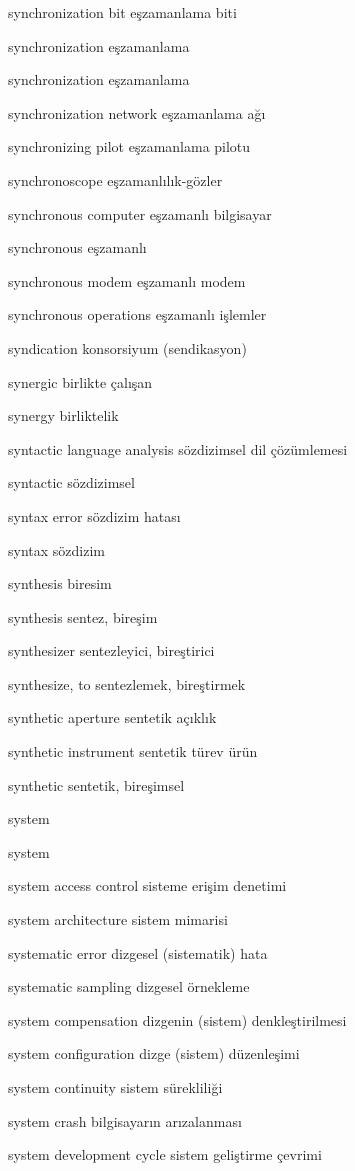 \documentclass[12pt,fleqn]{article}\usepackage{../../common}
\begin{document}
synchronization bit eşzamanlama biti

synchronization eşzamanlama

synchronization eşzamanlama

synchronization network eşzamanlama ağı

synchronizing pilot eşzamanlama pilotu

synchronoscope eşzamanlılık-gözler

synchronous computer eşzamanlı bilgisayar

synchronous eşzamanlı

synchronous modem eşzamanlı modem

synchronous operations eşzamanlı işlemler

syndication konsorsiyum (sendikasyon)

synergic birlikte çalışan

synergy birliktelik

syntactic language analysis sözdizimsel dil çözümlemesi

syntactic sözdizimsel

syntax error sözdizim hatası

syntax sözdizim

synthesis biresim

synthesis sentez, bireşim

synthesizer sentezleyici, bireştirici

synthesize, to sentezlemek, bireştirmek

synthetic aperture sentetik açıklık

synthetic instrument sentetik türev ürün

synthetic sentetik, bireşimsel

system

system

system access control sisteme erişim denetimi

system architecture sistem mimarisi

systematic error dizgesel (sistematik) hata

systematic sampling dizgesel örnekleme

system compensation dizgenin (sistem) denkleştirilmesi

system configuration dizge (sistem) düzenleşimi

system continuity sistem sürekliliği

system crash bilgisayarın arızalanması

system development cycle sistem geliştirme çevrimi
\end{document}
